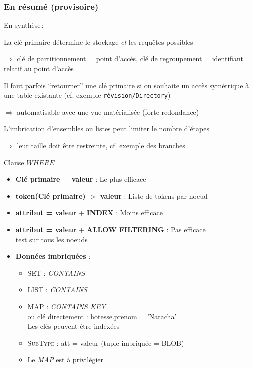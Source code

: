\begin{frame}[fragile] \frametitle{En résumé (provisoire)}

En synthèse\,:

\begin{redbullet}

   \item La clé primaire détermine le stockage \emph{et} les requêtes possibles
   
     $\Rightarrow$ \alert{clé de partitionnement} = point d'accès, \alert{clé de regroupement} =
   identifiant relatif au point d'accès
  
  \item Il faut parfois ``retourner'' une clé primaire si on souhaite un accès 
     symétrique à une table existante      (cf. exemple \texttt{révision/Directory})
     
      $\Rightarrow$  automatisable avec une vue matérialisée (forte redondance)

   \item L'imbrication d'ensembles ou listes peut limiter le nombre d'étapes 
   
      $\Rightarrow$ leur taille doit être restreinte, cf. exemple des branches
   
\end{redbullet}
	
\end{frame}




	
\begin{frame}[fragile]{Clause $WHERE$}
\begin{itemize}
	\item \textbf{Clé primaire = valeur} : Le plus efficace
	\item \textbf{token(Clé primaire) $>$ valeur} : Liste de tokens par noeud
	\item \textbf{attribut = valeur} + \textbf{INDEX} : Moins efficace
	\item \textbf{attribut = valeur} + \textbf{ALLOW FILTERING} : Pas efficace\\test sur tous les noeuds
	\item \textbf{Données imbriquées} :
	\begin{itemize}
		\item \textsc{SET} : \textit{CONTAINS}
		\item \textsc{LIST} : \textit{CONTAINS}
		\item \textsc{MAP} : \textit{CONTAINS KEY}\\ou clé directement : hotesse.prenom = 'Natacha'\\
		Les clés peuvent être indexées
		\item \textsc{SubType} : att = valeur (tuple imbriquée = BLOB)
		\item[$\Rightarrow$] Le \textit{MAP} est à privilégier
	\end{itemize}
\end{itemize}
\end{frame}

